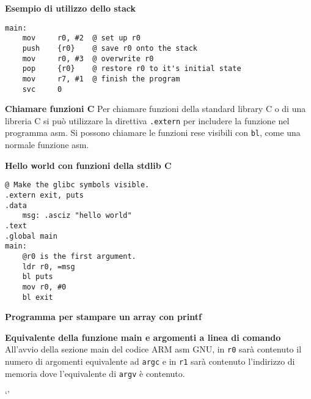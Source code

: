 \begin{exmp}
\textbf{Esempio di utilizzo dello stack}
\begin{lstlisting}[style=armn]
main:
	mov 	r0, #2  @ set up r0
	push	{r0}    @ save r0 onto the stack
	mov 	r0, #3  @ overwrite r0
	pop 	{r0}    @ restore r0 to it's initial state
	mov	    r7, #1  @ finish the program
	svc		0
\end{lstlisting}
\end{exmp}

\begin{exmp}
\textbf{Chiamare funzioni C}
Per chiamare funzioni della standard library C o di una libreria C si può utilizzare la direttiva
\verb|.extern| per includere la funzione nel programma asm. Si possono chiamare
le funzioni rese visibili con \verb|bl|, come una normale funzione asm.
\end{exmp}

\begin{exmp}
\textbf{Hello world con funzioni della stdlib C}
\begin{lstlisting}[style=armn]
@ Make the glibc symbols visible.
.extern exit, puts
.data
	msg: .asciz "hello world"
.text
.global main
main:
	@r0 is the first argument.
	ldr r0, =msg
	bl puts
	mov r0, #0
	bl exit
\end{lstlisting}
\end{exmp}

\begin{exmp}
\textbf{Programma per stampare un array con printf}
\end{exmp}

\begin{exmp}
	\textbf{Equivalente della funzione main e argomenti a linea di comando}
	All'avvio della sezione main del codice ARM asm GNU, in
	\verb|r0| sarà contenuto il numero di argomenti equivalente ad \verb|argc|
	e in \verb|r1| sarà contenuto l'indirizzo di memoria dove l'equivalente di \verb|argv| è contenuto.
\end{exmp}
`'

